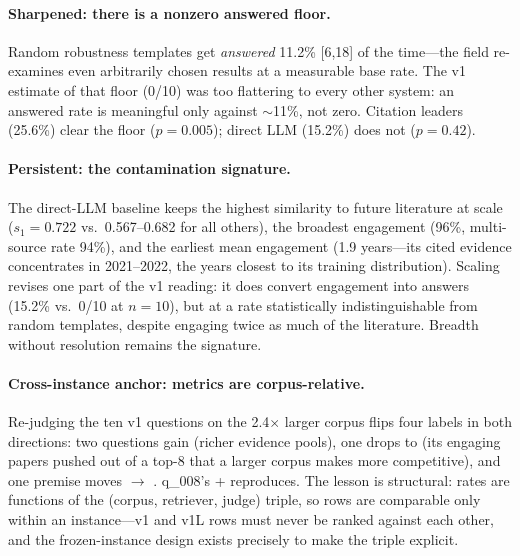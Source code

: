\paragraph{Sharpened: there is a nonzero answered floor.} Random
robustness templates get \emph{answered} 11.2\% [6,18] of the
time---the field re-examines even arbitrarily chosen results at a
measurable base rate. The v1 estimate of that floor (0/10) was too
flattering to every other system: an answered rate is meaningful only
against $\sim$11\%, not zero. Citation leaders (25.6\%) clear the floor
($p=0.005$); direct LLM (15.2\%) does not ($p=0.42$).

\paragraph{Persistent: the contamination signature.} The direct-LLM
baseline keeps the highest similarity to future literature at scale
($s_1=0.722$ vs.\ 0.567--0.682 for all others), the broadest engagement
(96\%, multi-source rate 94\%), and the earliest mean engagement (1.9
years---its cited evidence concentrates in 2021--2022, the years
closest to its training distribution). Scaling revises one part of the
v1 reading: it does convert engagement into answers (15.2\% vs.\ 0/10
at $n=10$), but at a rate statistically indistinguishable from random
templates, despite engaging twice as much of the literature. Breadth
without resolution remains the signature.

\paragraph{Cross-instance anchor: metrics are corpus-relative.}
Re-judging the ten v1 questions on the 2.4$\times$ larger corpus flips
four labels in both directions: two questions gain 
(richer evidence pools), one drops to  (its
engaging papers pushed out of a top-8 that a larger corpus makes more
competitive), and one premise moves $\to$
. q\_008's  +
 reproduces. The lesson is structural: rates are
functions of the (corpus, retriever, judge) triple, so rows are
comparable only within an instance---v1 and v1L rows must never be
ranked against each other, and the frozen-instance design exists
precisely to make the triple explicit.

